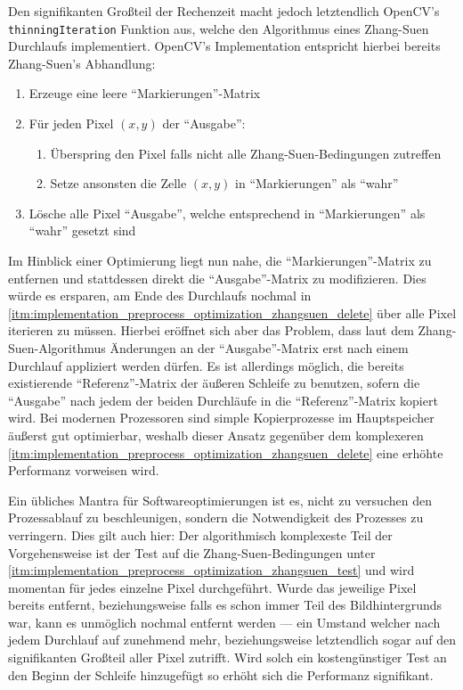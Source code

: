 Den signifikanten Großteil der Rechenzeit macht jedoch letztendlich OpenCV's \texttt{thinningIteration} Funktion aus, welche den Algorithmus eines Zhang-Suen Durchlaufs implementiert.
OpenCV's Implementation entspricht hierbei bereits Zhang-Suen's Abhandlung:
\begin{enumerate}
    \item Erzeuge eine leere \enquote{Markierungen}-Matrix
    \item Für jeden Pixel \((x,y)\) der \enquote{Ausgabe}:
    \begin{enumerate}[topsep=0pt]
        \item\label{itm:implementation_preprocess_optimization_zhangsuen_test} Überspring den Pixel falls nicht alle Zhang-Suen-Bedingungen zutreffen
        \item Setze ansonsten die Zelle \((x,y)\) in \enquote{Markierungen} als \enquote{wahr}
    \end{enumerate}
    \item\label{itm:implementation_preprocess_optimization_zhangsuen_delete} Lösche alle Pixel \enquote{Ausgabe}, welche entsprechend in \enquote{Markierungen} als \enquote{wahr} gesetzt sind
\end{enumerate}

Im Hinblick einer Optimierung liegt nun nahe, die \enquote{Markierungen}-Matrix zu entfernen und stattdessen direkt die \enquote{Ausgabe}-Matrix zu modifizieren.
Dies würde es ersparen, am Ende des Durchlaufs nochmal in \autoref{itm:implementation_preprocess_optimization_zhangsuen_delete} über alle Pixel iterieren zu müssen.
Hierbei eröffnet sich aber das Problem, dass laut dem Zhang-Suen-Algorithmus Änderungen an der \enquote{Ausgabe}-Matrix erst nach einem Durchlauf appliziert werden dürfen.
Es ist allerdings möglich, die bereits existierende \enquote{Referenz}-Matrix der äußeren Schleife zu benutzen, sofern die \enquote{Ausgabe} nach jedem der beiden Durchläufe in die \enquote{Referenz}-Matrix kopiert wird.
Bei modernen Prozessoren sind simple Kopierprozesse im Hauptspeicher äußerst gut optimierbar, weshalb dieser Ansatz gegenüber dem komplexeren \autoref{itm:implementation_preprocess_optimization_zhangsuen_delete} eine erhöhte Performanz vorweisen wird.

Ein übliches Mantra für Softwareoptimierungen ist es, nicht zu versuchen den Prozessablauf zu beschleunigen, sondern die Notwendigkeit des Prozesses zu verringern.
Dies gilt auch hier: Der algorithmisch komplexeste Teil der Vorgehensweise ist der Test auf die Zhang-Suen-Bedingungen unter \autoref{itm:implementation_preprocess_optimization_zhangsuen_test} und wird momentan für jedes einzelne Pixel durchgeführt.
Wurde das jeweilige Pixel bereits entfernt, beziehungsweise falls es schon immer Teil des Bildhintergrunds war, kann es unmöglich nochmal entfernt werden --- ein Umstand welcher nach jedem Durchlauf auf zunehmend mehr, beziehungsweise letztendlich sogar auf den signifikanten Großteil aller Pixel zutrifft.
Wird solch ein kostengünstiger Test an den Beginn der Schleife hinzugefügt so erhöht sich die Performanz signifikant.

